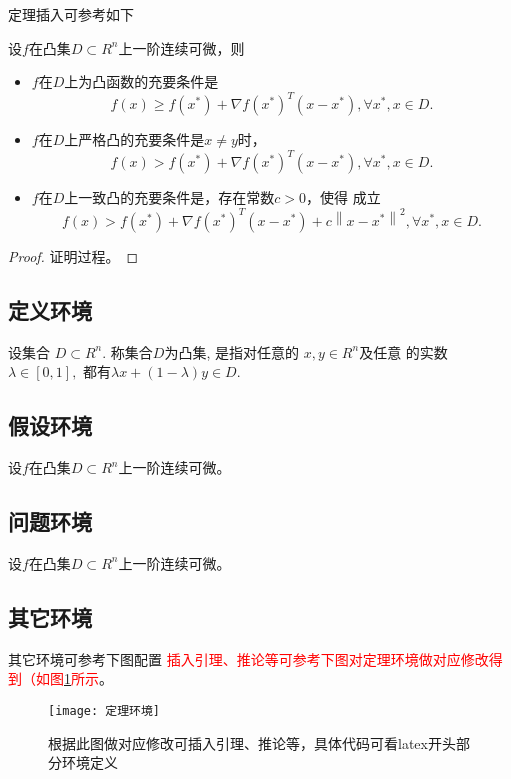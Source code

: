 \documentclass[master]{styles/hdu-thesis}
\begin{document}
定理插入可参考如下
\begin{theorem}
设$f$在凸集$D \subset {R^n}$上一阶连续可微，则
\begin{itemize}
\item $f$在$D$上为凸函数的充要条件是
\begin{equation*}
f(x) \ge f({x^*}) + \nabla f{({x^*})^T}(x - {x^*}),\forall {x^*},x \in D.
\end{equation*}
\item  $f$在$D$上严格凸的充要条件是$x \ne y$时，
\begin{equation*}
f(x) > f({x^*}) + \nabla f{({x^*})^T}(x - {x^*}),\forall {x^*},x \in D.
\end{equation*}
\item $f$在$D$上一致凸的充要条件是，存在常数$c > 0$，使得
成立
\begin{equation*}
f(x) > f({x^*}) + \nabla f{({x^*})^T}(x - {x^*}) + c{\left\| {x - {x^*}} \right\|^2},\forall {x^*},x \in D.
\end{equation*}
\end{itemize}
\end{theorem}
\begin{proof}
  证明过程。
  \end{proof}

\subsection{定义环境}
\begin{definition}
设集合 $D \subset {R^n}.$ 称集合$D$为凸集, 是指对任意的 $x,y \in {R^n}$及任意
的实数$\lambda  \in [0,1],$ 都有$\lambda x + (1 - \lambda )y \in D.$
\end{definition}

\subsection{假设环境}
\begin{assumption}
设$f$在凸集$D \subset {R^n}$上一阶连续可微。
\end{assumption}
\subsection{问题环境}
\begin{problem}
  设$f$在凸集$D \subset {R^n}$上一阶连续可微。
  \end{problem}

\subsection{其它环境}
其它环境可参考下图配置
\textcolor{red}{插入引理、推论等可参考下图对定理环境做对应修改得到（如图\ref{fig_定理环境}所示}。
 \begin{figure}[!htb]
  \centering
  \texttt{[image: 定理环境]}
  \caption{根据此图做对应修改可插入引理、推论等，具体代码可看latex开头部分环境定义}
  \label{fig_定理环境}
\end{figure}
\end{document}
